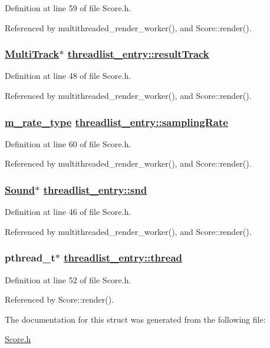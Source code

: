 Definition at line 59 of file Score.h.

Referenced by multithreaded\_\-render\_\-worker(), and Score::render().\hypertarget{structthreadlist__entry_o1}{
\subsubsection[resultTrack]{\setlength{\rightskip}{0pt plus 5cm}\hyperlink{classMultiTrack}{Multi\-Track}$\ast$ \hyperlink{structthreadlist__entry_o1}{threadlist\_\-entry::result\-Track}}}
\label{structthreadlist__entry_o1}




Definition at line 48 of file Score.h.

Referenced by multithreaded\_\-render\_\-worker(), and Score::render().\hypertarget{structthreadlist__entry_o7}{
\subsubsection[samplingRate]{\setlength{\rightskip}{0pt plus 5cm}\hyperlink{Types_8h_a4}{m\_\-rate\_\-type} \hyperlink{structthreadlist__entry_o7}{threadlist\_\-entry::sampling\-Rate}}}
\label{structthreadlist__entry_o7}




Definition at line 60 of file Score.h.

Referenced by multithreaded\_\-render\_\-worker(), and Score::render().\hypertarget{structthreadlist__entry_o0}{
\subsubsection[snd]{\setlength{\rightskip}{0pt plus 5cm}\hyperlink{classSound}{Sound}$\ast$ \hyperlink{structthreadlist__entry_o0}{threadlist\_\-entry::snd}}}
\label{structthreadlist__entry_o0}




Definition at line 46 of file Score.h.

Referenced by multithreaded\_\-render\_\-worker(), and Score::render().\hypertarget{structthreadlist__entry_o3}{
\subsubsection[thread]{\setlength{\rightskip}{0pt plus 5cm}pthread\_\-t$\ast$ \hyperlink{structthreadlist__entry_o3}{threadlist\_\-entry::thread}}}
\label{structthreadlist__entry_o3}




Definition at line 52 of file Score.h.

Referenced by Score::render().

The documentation for this struct was generated from the following file:\begin{CompactItemize}
\item 
\hyperlink{Score_8h}{Score.h}\end{CompactItemize}

